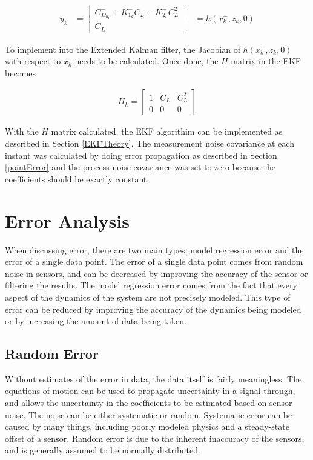 \documentclass[12pt]{ucthesis}
\begin{document}
\begin{align}
y_k &= \begin{bmatrix} C^-_{D_{0_k}}+K^-_{1_k}C_L+K^-_{2_k}C^2_L \\ C_L \end{bmatrix} &=h(x^-_k,z_k,0)
\end{align}


To implement into the Extended Kalman filter, the Jacobian of $h(x^-_k,z_k,0)$ with respect to $x_k$ needs to be calculated. Once done, the $H$ matrix in the EKF becomes

\begin{align}
H_k = \begin{bmatrix}
1 & C_L & C^2_L\\0&0&0
\end{bmatrix}
\end{align}


With the $H$ matrix calculated, the EKF algorithim can be implemented as described in Section \ref{EKFTheory}. The measurement noise covariance at each instant was calculated by doing error propagation as described in Section \ref{pointError} and the process noise covariance was set to zero because the coefficients should be exactly constant.

\chapter{Error Analysis}
When discussing error, there are two main types: model regression error and the error of a single data point. The error of a single data point comes from random noise in sensors, and can be decreased by improving the accuracy of the sensor or filtering the results. The model regression error comes from the fact that every aspect of the dynamics of the system are not precisely modeled. This type of error can be reduced by improving the accuracy of the dynamics being modeled or by increasing the amount of data being taken.
\section{Random Error}
\label{pointErrorSection}
Without estimates of the error in data, the data itself is fairly meaningless. The equations of motion can be used to propagate uncertainty in a signal through, and allows the uncertainty in the coefficients to be estimated based on sensor noise. The noise can be either systematic or random. Systematic error can be caused by many things, including poorly modeled physics and a steady-state offset of a sensor. Random error is due to the inherent inaccuracy of the sensors, and is generally assumed to be normally distributed.
\end{document}
